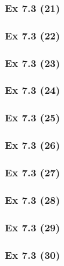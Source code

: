 \newpage		%


\subsubsection{Ex 7.3 (21)}\label{sec:Ex_7.3.21}

\subsubsection{Ex 7.3 (22)}\label{sec:Ex_7.3.22}

\subsubsection{Ex 7.3 (23)}\label{sec:Ex_7.3.23}

\subsubsection{Ex 7.3 (24)}\label{sec:Ex_7.3.24}

\subsubsection{Ex 7.3 (25)}\label{sec:Ex_7.3.25}

\subsubsection{Ex 7.3 (26)}\label{sec:Ex_7.3.26}

\subsubsection{Ex 7.3 (27)}\label{sec:Ex_7.3.27}

\subsubsection{Ex 7.3 (28)}\label{sec:Ex_7.3.28}

\subsubsection{Ex 7.3 (29)}\label{sec:Ex_7.3.29}

\subsubsection{Ex 7.3 (30)}\label{sec:Ex_7.3.30}

